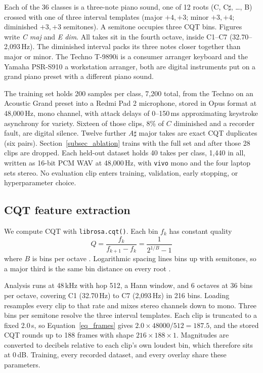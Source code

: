 \documentclass[pdflatex,sn-mathphys-num,iicol]{sn-jnl}
\begin{document}
Each of the 36 classes is a three-note piano sound, one of 12 roots (C, C$\sharp$, \ldots, B) crossed with one of three interval templates (major $+4,+3$; minor $+3,+4$; diminished $+3,+3$ semitones). A semitone occupies three CQT bins. Figures write \emph{C maj} and \emph{E dim}. All takes sit in the fourth octave, inside C1--C7 (32.70--2{,}093\,Hz). The diminished interval packs its three notes closer together than major or minor. The Techno T-9890i is a consumer arranger keyboard and the Yamaha PSR-S910 a workstation arranger, both are digital instruments put on a grand piano preset with a different piano sound.

The training set holds 200 samples per class, 7{,}200 total, from the Techno on an Acoustic Grand preset into a Redmi Pad 2 microphone, stored in Opus format at 48{,}000\,Hz, mono channel, with attack delays of 0--150\,ms approximating keystroke asynchrony for variety. Sixteen of those clips, 8\% of $C$ diminished and a recorder fault, are digital silence. Twelve further $A\sharp$ major takes are exact CQT duplicates (six pairs). Section~\ref{subsec_ablation} trains with the full set and after those 28 clips are dropped. Each held-out dataset holds 40 takes per class, 1{,}440 in all, written as 16-bit PCM WAV at 48{,}000\,Hz, with \texttt{vivo} mono and the four laptop sets stereo. No evaluation clip enters training, validation, early stopping, or hyperparameter choice.

\subsection{CQT feature extraction}\label{subsec_cqt}

We compute CQT with \texttt{librosa.cqt()}. Each bin $f_k$ has constant quality
\begin{equation}
Q = \frac{f_k}{f_{k+1} - f_k} = \frac{1}{2^{1/B} - 1}
\label{eq_cqt}
\end{equation}
where $B$ is bins per octave \cite{Li2021,Lacoste2007}. Logarithmic spacing lines bins up with semitones, so a major third is the same bin distance on every root \cite{Harte2010}.

Analysis runs at 48\,kHz with hop 512, a Hann window, and 6 octaves at 36 bins per octave, covering C1 (32.70\,Hz) to C7 (2{,}093\,Hz) in 216 bins. Loading resamples every clip to that rate and mixes stereo channels down to mono. Three bins per semitone resolve the three interval templates. Each clip is truncated to a fixed 2.0\,s, so Equation~\ref{eq_frames} gives $2.0\times 48000/512=187.5$, and the stored CQT rounds up to 188 frames with shape $216 \times 188 \times 1$. Magnitudes are converted to decibels relative to each clip's own loudest bin, which therefore sits at 0\,dB. Training, every recorded dataset, and every overlay share these parameters.
\end{document}
